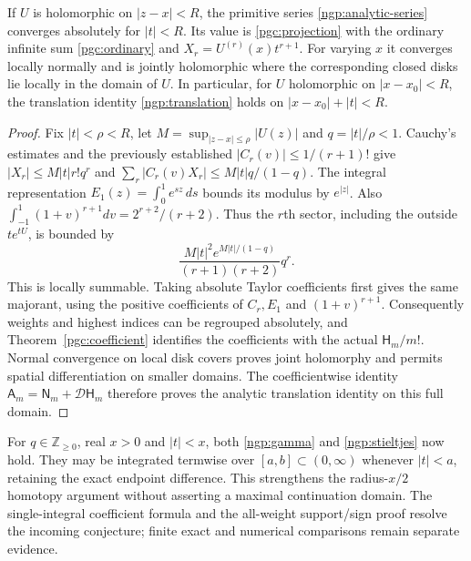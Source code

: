\begin{theorem}
\label{pgc:analytic}
If $U$ is holomorphic on $|z-x|<R$, the primitive series
\eqref{ngp:analytic-series} converges absolutely for $|t|<R$.
Its value is \eqref{pgc:projection} with the ordinary infinite sum
\eqref{pgc:ordinary} and $X_r=U^{(r)}(x)t^{r+1}$.
For varying $x$ it converges locally normally and is jointly holomorphic
where the corresponding closed disks lie locally in the domain of $U$.
In particular, for $U$ holomorphic on $|x-x_0|<R$, the translation
identity \eqref{ngp:translation} holds on $|x-x_0|+|t|<R$.
\end{theorem}
\begin{proof}
Fix $|t|<\rho<R$, let $M=\sup_{|z-x|\le\rho}|U(z)|$ and
$q=|t|/\rho<1$. Cauchy's estimates and the previously established
$|C_r(v)|\le1/(r+1)!$ give
$|X_r|\le M|t|r!q^r$ and
$\sum_r|C_r(v)X_r|\le M|t|q/(1-q)$.
The integral representation $E_1(z)=\int_0^1e^{sz}\,ds$ bounds
its modulus by $e^{|z|}$. Also
$\int_{-1}^1(1+v)^{r+1}dv=2^{r+2}/(r+2)$.
Thus the $r$th sector, including the outside $t e^{tU}$, is bounded by
\begin{equation}\label{pgc:majorant}
       \frac{M|t|^2e^{M|t|/(1-q)}}{(r+1)(r+2)}q^r.
\end{equation}
This is locally summable. Taking absolute Taylor coefficients first
gives the same majorant, using the positive coefficients of $C_r,E_1$
and $(1+v)^{r+1}$. Consequently weights and highest indices can be
regrouped absolutely, and Theorem~\ref{pgc:coefficient} identifies the
coefficients with the actual $\mathsf H_m/m!$.
Normal convergence on local disk covers proves joint holomorphy and
permits spatial differentiation on smaller domains. The coefficientwise
identity $\mathsf A_m=\mathsf N_m+\mathcal D\mathsf H_m$ therefore
proves the analytic translation identity on this full domain.
\end{proof}

For $q\in\mathbb Z_{\ge0}$, real $x>0$ and $|t|<x$, both
\eqref{ngp:gamma} and \eqref{ngp:stieltjes} now hold.
They may be integrated termwise over $[a,b]\subset(0,\infty)$
whenever $|t|<a$, retaining the exact endpoint difference.
This strengthens the radius-$x/2$ homotopy argument without asserting
a maximal continuation domain. The single-integral coefficient formula
and the all-weight support/sign proof resolve the incoming conjecture;
finite exact and numerical comparisons remain separate evidence.

